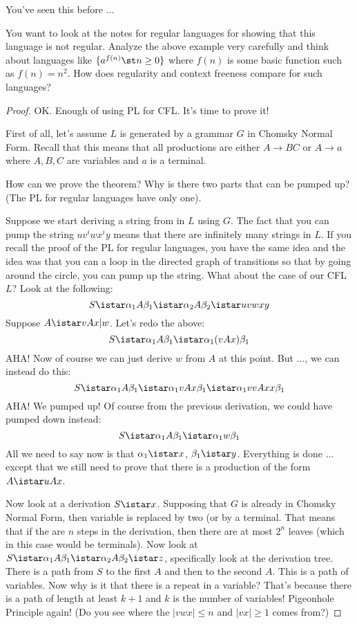 

You've seen this before ...



You want to look at the notes for regular languages for showing
that this language is not regular.
Analyze the above example very carefully and think about
languages like $\{a^{f(n)} \st n \geq 0 \}$ where $f(n)$ is some
basic function such as $f(n) = n^2$.
How does regularity and context freeness compare for such languages?


\newpage
\begin{proof}
OK. Enough of using PL for CFL. It's time to prove it!

First of all, let's assume $L$ is generated by a grammar $G$ in
Chomsky Normal Form. Recall that this means that all productions are
either $A \rightarrow BC$ or $A \rightarrow a$ where $A,B,C$ are
variables and $a$ is a terminal.

How can we prove the theorem? Why is there two parts that can be
pumped up? (The PL for regular languages have only one).

Suppose we start deriving a string from in $L$ using $G$. The fact
that you can pump the string $uv^iwx^iy$ means that there are
infinitely many strings in $L$. If you recall the proof of the PL
for regular languages, you have the same idea and the idea was that
you can a loop in the directed graph of transitions so that by going
around the circle, you can pump up the string. What about the case
of our CFL $L$? Look at the following:
\[
 S \istar \alpha_1 A \beta_1 \istar \alpha_2 A \beta_2 \istar uvwxy
\]
Suppose $A \istar vAx|w$. Let's redo the above:
\[
 S \istar \alpha_1 A \beta_1 \istar \alpha_1 (vAx) \beta_1
\]
AHA! Now of course we can just derive $w$ from $A$ at this point.
But $\ldots$, we can instead do this:
\[
 S \istar \alpha_1 A \beta_1 \istar \alpha_1 v A x\beta_1 \istar
 \alpha_1 vvA xx \beta_1
\]
AHA! We pumped up! Of course from the previous derivation, we could
have pumped down instead:
\[
 S \istar \alpha_1 A \beta_1 \istar \alpha_1 w \beta_1
\]
All we need to say now is that $\alpha_1 \istar x$, $\beta_1 \istar
y$. Everything is done $\ldots$ except that we still need to prove
that there is a production of the form $A \istar uAx$.

Now look at a derivation $S \istar x$. Supposing that $G$ is
already in Chomsky Normal Form, then variable is replaced by two
(or by a terminal. That means that if the are $n$ steps in the
derivation, then there are at most $2^n$ leaves (which in this
case would be terminals). Now look at $S \istar \alpha_1 A \beta_1
\istar \alpha_2 A \beta_2 \istar z$, specifically look at the
derivation tree. 
There is a path from $S$ to the first $A$ and
then to the second $A$. 
This is a path of variables. 
Now why is it that there is a repeat in a variable?
That's because there is a path of length at least $k + 1$ and $k$ is the
number of variables!
Pigeonhole Principle again!
(Do you see where the $|vwx| \leq n$ and $|vx| \geq 1$ comes from?)
\end{proof}
